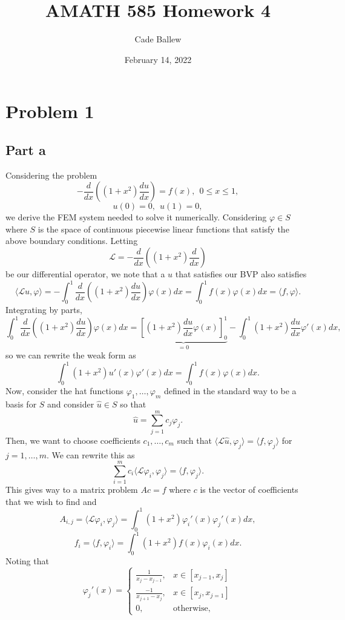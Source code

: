 \documentclass{article}
\title{AMATH 585 Homework 4}
\author{Cade Ballew}
\date{February 14, 2022}
\begin{document}
	
\maketitle
	
\section{Problem 1}
\subsection{Part a}
Considering the problem
\[
- \frac{d}{dx} \left( (1 + x^2 ) \frac{du}{dx} \right) = f(x) ,~~0 \leq x \leq 1,
\]
\[
u(0) = 0,~~u(1) = 0,
\]
we derive the FEM system needed to solve it numerically. Considering $\varphi\in S$ where $S$ is the space of continuous piecewise linear functions that satisfy the above boundary conditions. Letting 
\[
\mathcal{L}= - \frac{d}{dx} \left( (1 + x^2 ) \frac{d}{dx} \right)
\]
be our differential operator, we note that a $u$ that satisfies our BVP also satisfies
\[
\langle\mathcal{L}u,\varphi\rangle=-\int_0^1 \frac{d}{dx} \left( (1 + x^2 ) \frac{du}{dx} \right)\varphi(x)dx=\int_0^1 f(x)\varphi(x)dx=\langle f,\varphi\rangle.
\]
Integrating by parts,
\[
\int_0^1 \frac{d}{dx} \left( (1 + x^2 ) \frac{du}{dx} \right)\varphi(x)dx=\underbrace{\left[(1 + x^2 ) \frac{du}{dx}\varphi(x)\right]_0^1}_{=0}-\int_0^1(1 + x^2 ) \frac{du}{dx} \varphi'(x)dx,
\]
so we can rewrite the weak form as
\[
\int_0^1(1 + x^2 ) u'(x) \varphi'(x)dx=\int_0^1 f(x)\varphi(x)dx.
\]
Now, consider the hat functions $\varphi_1,\ldots,\varphi_m$ defined in the standard way to be a basis for $S$ and consider $\hat{u}\in S$ so that 
\[
\hat{u}=\sum_{j=1}^m c_j\varphi_j.
\]
Then, we want to choose coefficients $c_1,\ldots,c_m$ such that $\langle\mathcal{L}\hat{u},\varphi_j\rangle=\langle f,\varphi_j\rangle$ for $j=1,\ldots,m$. We can rewrite this as
\[
\sum_{i=1}^m c_i\langle\mathcal{L}\varphi_i,\varphi_j\rangle=\langle f,\varphi_j\rangle.
\]
This gives way to a matrix problem $Ac=f$ where $c$ is the vector of coefficients that we wish to find and 
\[
A_{i,j}=\langle\mathcal{L}\varphi_i,\varphi_j\rangle=\int_0^1(1 + x^2 ) \varphi_i'(x) \varphi_j'(x)dx,
\]
\[
f_i=\langle f,\varphi_i\rangle=\int_0^1(1 + x^2 ) f(x) \varphi_i(x)dx.
\]
Noting that 
\[
\varphi_j'(x)=\begin{cases}
\frac{1}{x_j-x_{j-1}}, &x\in[x_{j-1},x_j]\\
\frac{-1}{x_{j+1}-x_j}, &x\in[x_j,x_{j=1}]\\
0,  &\text{otherwise},
\end{cases}
\]
\end{document}
